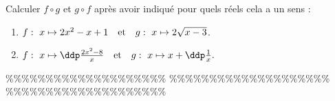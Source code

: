 



\begin{exercice}  \; Calculer $f\circ g$ et $g\circ f$ apr\`es avoir indiqu\'e pour quels r\'eels cela a un sens :
\begin{enumerate}
\item $f:\ x\mapsto 2x^2-x+1\quad \hbox{et}\quad g:\ x\mapsto 2\sqrt{x-3}$.
\item $f:\ x\mapsto \ddp\frac{2x^2-8}{x}\quad\hbox{et}\quad g:\ x\mapsto x+\ddp\frac{1}{x}.$
\end{enumerate}
\end{exercice}


\%\%\%\%\%\%\%\%\%\%\%\%\%\%\%\%\%\%\%\%
\%\%\%\%\%\%\%\%\%\%\%\%\%\%\%\%\%\%\%\%
\%\%\%\%\%\%\%\%\%\%\%\%\%\%\%\%\%\%\%\%



